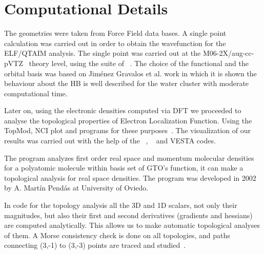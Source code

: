 
\section{Computational Details}\label{comp_details}

The geometries were taken from Force Field data bases. A single point calculation
was carried out in order to obtain the wavefunction for the ELF/QTAIM analysis.
The single point was carried out at the 
M06-2X/aug-cc-pVTZ~\cite{Zhao2006,Kendall1992,Woon1993} theory level, using the
suite of {}~\cite{g16}. The choice of the functional and the
orbital basis was based on Jiménez Gravalos et al. work
 in which it is shown the behaviour about the \gls{HB} is
well described for the water cluster with moderate computational time.

Later on, using the electronic densities computed via DFT we proceeded to
analyse the topological properties of Electron Localization Function. Using
the TopMod, NCI plot and {} programs for these
purposes~\cite{topmod09, Boto2020, promolden}. The visualization of our results
was carried out with the help of the {}~\cite{g16},
{}~\cite{HUMP96} and VESTA \cite{vesta} codes.

The {} program analyzes first order real space and momentum
molecular densities for a polyatomic molecule within basis set of GTO's
function, it can make a topological analysis for real space densities.  The
program was developed in 2002 by A. Martín Pendás at University of Oviedo.

In {} code for the topology analysis all the 3D and 1D scalars, not
only their magnitudes, but also their first and second derivatives (gradients
and hessians) are computed analytically. This allows us to make automatic
topological analyses of them. A Morse consistency check is done on all
topologies, and paths connecting (3,-1) to (3,-3) points are traced and
studied~\cite{promolden}.

